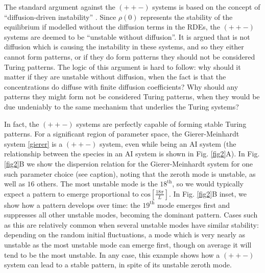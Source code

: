 The standard argument against the $(++-)$ systems is based on the concept of ``diffusion-driven instability'' \cite{murray2001mathematical,moreo2010modelling,klika2012influence,smith2018model}. Since $\rho(0)$ represents the stability of the equilibrium if modelled without the diffusion terms in the RDEs, the $(++-)$ systems are deemed to be ``unstable without diffusion''. It is argued that is not diffusion which is causing the instability in these systems, and so they either cannot form patterns, or if they do form patterns they should not be considered Turing patterns. The logic of this argument is hard to follow: why should it matter if they are unstable without diffusion, when the fact is that the concentrations do diffuse with finite diffusion coefficients? Why should any patterns they might form not be considered Turing patterns, when they would be due undeniably to the same mechanism that underlies the Turing systems? 

In fact, the $(++-)$ systems are perfectly capable of forming stable Turing patterns. For a significant region of parameter space, the Gierer-Meinhardt system \eqref{gierer} is a $(++-)$ system, even while being an AI system (the relationship between the species in an AI system is shown in Fig. \ref{fig2}A). In Fig. \ref{fig2}B we show the dispersion relation for the Gierer-Meinhardt system for one such parameter choice (see caption), noting that the zeroth mode is unstable, as well as $16$ others. The most unstable mode is the $18^\text{th}$, so we would typically expect a pattern to emerge proportional to $\text{cos}\left[\frac{18\pi}{L}\right]$. In Fig. \ref{fig2}B inset, we show how a pattern develops over time: the $19^\text{th}$ mode emerges first and suppresses all other unstable modes, becoming the dominant pattern. Cases such as this are relatively common when several unstable modes have similar stability: depending on the random initial fluctuations, a mode which is very nearly as unstable as the most unstable mode can emerge first, though on average it will tend to be the most unstable. In any case, this example shows how a $(++-)$ system can lead to a stable pattern, in spite of its unstable zeroth mode.

